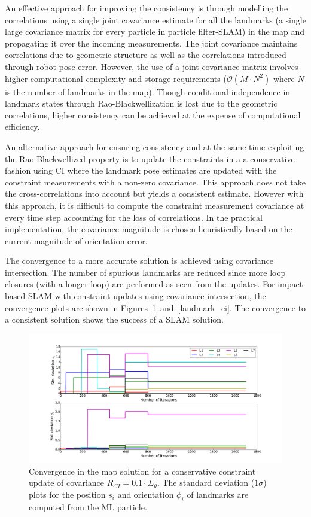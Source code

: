 An effective approach for improving the consistency is through modelling the correlations using a single joint covariance estimate for all the landmarks (a single large covariance matrix for every particle in particle filter-SLAM) in the map and propagating it over the incoming measurements. The joint covariance maintains correlations due to geometric structure as well as the correlations introduced through robot pose error. However, the use of a joint covariance matrix involves higher computational complexity and storage requirements ($\mathcal{O}(M\cdot N^2)$ where $N$ is the number of landmarks in the map). Though conditional independence in landmark states through Rao-Blackwellization is lost due to the geometric correlations, higher consistency can be achieved at the expense of computational efficiency.

An alternative approach for ensuring consistency and at the same time exploiting the Rao-Blackwellized property is to update the constraints in a a conservative fashion using \acf{CI} where the landmark pose estimates are updated with the constraint measurements with a non-zero covariance. This approach does not take the cross-correlations into account but yields a consistent estimate. However with this approach, it is difficult to compute the constraint measurement covariance at every time step accounting for the loss of correlations. In the practical implementation, the covariance magnitude is chosen heuristically based on the current magnitude of orientation error.

The convergence to a more accurate solution is achieved using covariance intersection. The number of spurious landmarks are reduced since more loop closures (with a longer loop) are performed as seen from the updates. For impact-based SLAM with constraint updates using covariance intersection, the convergence plots are shown in Figures~\ref{landmark_cilc}~and~\ref{landmark_ci}. The convergence to a consistent solution shows the success of a SLAM solution.

\begin{figure}
\centering
\hspace*{-1cm}\includegraphics[scale=0.4]{./images/landmark_cilc}
\caption{Convergence in the map solution for a conservative constraint update of covariance $R_{CI}=0.1\cdot\Sigma_{\theta}$. The standard deviation ($1\sigma$) plots for the position $s_i$ and orientation $\phi_i$ of landmarks are computed from the ML particle.}
\label{landmark_cilc}
\end{figure}

